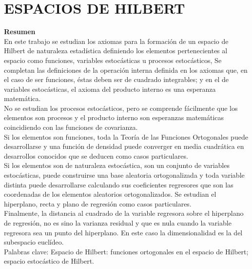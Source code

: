 \newtheorem{axi}{\sc Axioma}%
\renewcommand{\theequation}{\arabic{equation}}
\chapter{ESPACIOS DE HILBERT}

{\Large \bf Resumen}\\

En este trabajo se estudian los axiomas para la formación de un espacio de Hilbert de naturaleza estadística definiendo los elementos pertenecientes al espacio como funciones, variables estocásticas u procesos estocásticos, Se completan las definiciones de la operación interna definida en los axiomas que, en el caso de ser funciones, éstas deben ser de cuadrado integrables; y en el de variables estocásticas, el axioma del producto interno es una esperanza matemática.
\\

No se estudian los procesos estocásticos, pero se comprende fácilmente que los elementos son procesos y el producto interno son esperanzas matemáticas coincidiendo con las funciones de covarianza.\\

Si los elementos son funciones, toda la Teoría de las Funciones Ortogonales puede desarrollarse y una función de densidad puede converger en media cuadrática en desarrollos conocidos que se deducen como casos particulares.
\\

Si los elementos son de naturaleza estocástica, son un conjunto de variables estocásticas, puede construirse una base aleatoria ortogonalizada y toda variable distinta puede desarrollarse calculando sus coeficientes regresores que son las coordenadas de los elementos aleatorios ortogonalizados. Se estudian el hiperplano, recta y plano de regresión como casos particulares. \\

Finalmente, la distancia al cuadrado de la variable regresora sobre el hiperplano de regresión, no es sino la varianza residual y que es nula cuando la variable regresora sea un punto del hiperplano. En este caso la dimensionalidad es la del subespacio euclídeo.
\\

Palabras clave: Espacio de Hilbert: funciones ortogonales en el espacio de Hilbert; espacio estocástico de Hilbert.
\\

